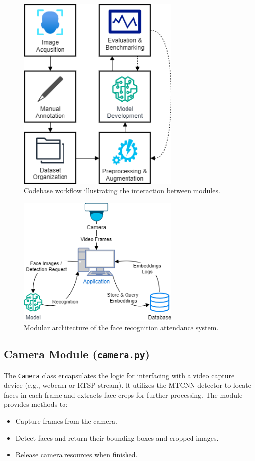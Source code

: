 \begin{figure}[ht!]
    \centering
    \includegraphics[width=0.7\textwidth]{../Files/codebase_workflow.png}
    \caption{Codebase workflow illustrating the interaction between modules.}
    \label{fig:codebase-workflow}
\end{figure}

\begin{figure}[ht!]
    \centering
    \includegraphics[width=0.7\textwidth]{../Files/system_architecture.png}
    \caption{Modular architecture of the face recognition attendance system.}
    \label{fig:system-architecture}
\end{figure}

\subsection{Camera Module (\texttt{camera.py})}
The \texttt{Camera} class encapsulates the logic for interfacing with a video capture device (e.g., webcam or RTSP stream). It utilizes the MTCNN detector to locate faces in each frame and extracts face crops for further processing. The module provides methods to:
\begin{itemize}
    \item Capture frames from the camera.
    \item Detect faces and return their bounding boxes and cropped images.
    \item Release camera resources when finished.
\end{itemize}

